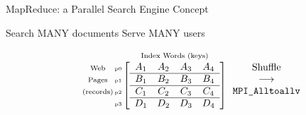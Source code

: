 \begin{frame}{MapReduce: a Parallel Search Engine Concept}
  \begin{block}{Search MANY documents \hfill Serve MANY users}
    \begin{center}\scriptsize
      \begin{equation*}
        \begin{array}{c@{\hspace{-2ex}}r@{\hspace{-2ex}}c}
          \begin{array}{c}
            \mbox{\scriptsize Web} \\
            \mbox{\scriptsize Pages} \\
            \mbox{\scriptsize (records)}
          \end{array} &
          \begin{array}{c}\tiny
            \\ \mbox{\tiny p0} \\ \mbox{\tiny p1} \\
            \mbox{\tiny p2} \\ \mbox{\tiny p3}
          \end{array} &
          \begin{array}{c}
            \mbox{\scriptsize Index Words (keys)} \\
            \left[
            \begin{array}{cccc}
              A_1 & A_2  & A_3 & A_4 \\
              \hline
              B_1 & B_2  & B_3 & B_4 \\
              \hline
              C_1 & C_2  & C_3 & C_4 \\
              \hline
              D_1 & D_2  & D_3 & D_4
            \end{array}
            \right]
          \end{array}
        \end{array}
        \hbox{\hspace{-2ex}}
        \begin{array}{c}
          \hbox{Shuffle} \\
          \longrightarrow \\
          \mbox{\code{MPI\_Alltoallv}}
        \end{array}
        \hbox{\hspace{-2ex}}
        \begin{array}{c@{\hspace{-2ex}}r@{\hspace{-2ex}}c}

\end{array}
\end{equation*}
\end{center}
\end{block}
\end{frame}
